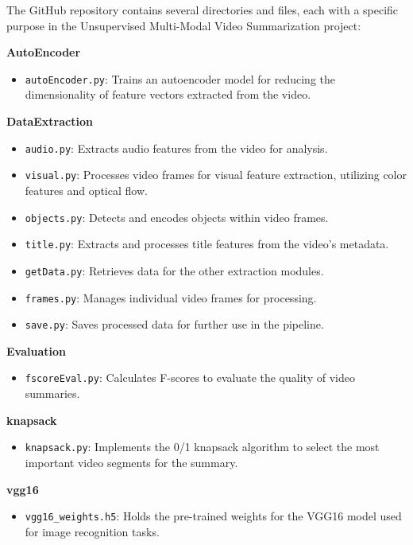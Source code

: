 \documentclass[conference]{IEEEtran}
\begin{document}
The GitHub repository contains several directories and files, each with a specific purpose in the Unsupervised Multi-Modal Video Summarization project:

\textbf{AutoEncoder}
\begin{itemize}
    \item \texttt{autoEncoder.py}: Trains an autoencoder model for reducing the dimensionality of feature vectors extracted from the video.
\end{itemize}

\textbf{DataExtraction}
\begin{itemize}
    \item \texttt{audio.py}: Extracts audio features from the video for analysis.
    \item \texttt{visual.py}: Processes video frames for visual feature extraction, utilizing color features and optical flow.
    \item \texttt{objects.py}: Detects and encodes objects within video frames.
    \item \texttt{title.py}: Extracts and processes title features from the video's metadata.
    \item \texttt{getData.py}: Retrieves data for the other extraction modules.
    \item \texttt{frames.py}: Manages individual video frames for processing.
    \item \texttt{save.py}: Saves processed data for further use in the pipeline.
\end{itemize}

\textbf{Evaluation}
\begin{itemize}
    \item \texttt{fscoreEval.py}: Calculates F-scores to evaluate the quality of video summaries.
\end{itemize}

\textbf{knapsack}
\begin{itemize}
    \item \texttt{knapsack.py}: Implements the 0/1 knapsack algorithm to select the most important video segments for the summary.
\end{itemize}

\textbf{vgg16}
\begin{itemize}
    \item \texttt{vgg16\_weights.h5}: Holds the pre-trained weights for the VGG16 model used for image recognition tasks.
\end{itemize}
\end{document}
